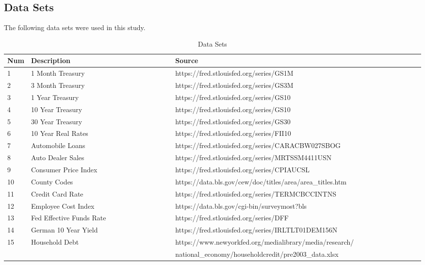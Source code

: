 \documentclass[sigconf,nonacm,11pt]{acmart}
\begin{document}



\appendix
\begin{appendix}

\section{Data Sets}
\label{appendix:datasets}
The following data sets were used in this study.



\begin{table}[ht]
\caption{Data Sets}
\centering
\begin{tabular}{p{0.05\linewidth}p{0.35\linewidth}p{0.6\linewidth}}
\hline
Num & Description & Source\\
\hline
1 & 1 Month Treasury & https://fred.stlouisfed.org/series/GS1M\\
2 & 3 Month Treasury & https://fred.stlouisfed.org/series/GS3M\\
3 & 1 Year Treasury & https://fred.stlouisfed.org/series/GS10\\
4 & 10 Year Treasury & https://fred.stlouisfed.org/series/GS10\\
5 & 30 Year Treasury & https://fred.stlouisfed.org/series/GS30\\
6 & 10 Year Real Rates & https://fred.stlouisfed.org/series/FII10\\
7 & Automobile Loans & https://fred.stlouisfed.org/series/CARACBW027SBOG\\
8 & Auto Dealer Sales & https://fred.stlouisfed.org/series/MRTSSM4411USN\\
9 & Consumer Price Index & https://fred.stlouisfed.org/series/CPIAUCSL\\
10 & County Codes & https://data.bls.gov/cew/doc/titles/area/area_titles.htm\\
11 & Credit Card Rate & https://fred.stlouisfed.org/series/TERMCBCCINTNS\\
12 & Employee Cost Index & https://data.bls.gov/cgi-bin/surveymost?bls\\
13 & Fed Effective Funds Rate  & https://fred.stlouisfed.org/series/DFF\\
14 & German 10 Year Yield & https://fred.stlouisfed.org/series/IRLTLT01DEM156N\\
15 & Household Debt & https://www.newyorkfed.org/medialibrary/media/research/\\
 & & national\_economy/householdcredit/pre2003\_data.xlsx\\ 

\end{tabular}
\end{table}
\end{appendix}
\end{document}
